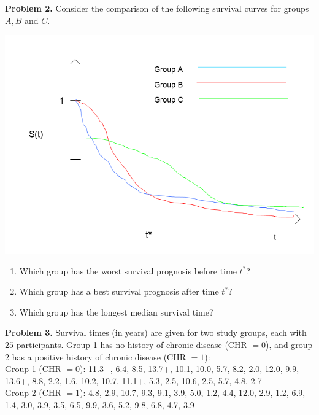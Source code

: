 \documentclass[12pt]{article}
\begin{document}
\textbf{Problem 2.}
Consider the comparison of the following survival curves for groups $A, B$ and $C$.
\begin{center}
 \includegraphics[width = \textwidth]{Chpt1_surv}
 \end{center}
\begin{enumerate}
\item Which group has the worst survival prognosis before time $t^*$?
\item Which group has a best survival prognosis after time $t^*$?
\item Which group has the longest median survival time?
\end{enumerate}

\textbf{Problem 3.}
Survival times (in years) are given for two study groups, each with $25$ participants. Group 1 has no history of chronic disease (CHR $= 0$), and group 2 has a positive history of chronic disease (CHR $= 1$): \\

Group 1 (CHR $= 0$): 11.3+, 6.4, 8.5, 13.7+, 10.1, 10.0, 5.7, 8.2, 2.0, 12.0, 9.9, 13.6+, 8.8, 2.2, 1.6, 10.2, 10.7, 11.1+, 5.3, 2.5, 10.6, 2.5, 5.7, 4.8, 2.7 \\

Group 2 (CHR $= 1$): 4.8, 2.9, 10.7, 9.3, 9.1, 3.9, 5.0, 1.2, 4.4, 12.0, 2.9, 1.2, 6.9, 1.4, 3.0, 3.9, 3.5, 6.5, 9.9, 3.6, 5.2, 9.8, 6.8, 4.7, 3.9 \\
\end{document}
